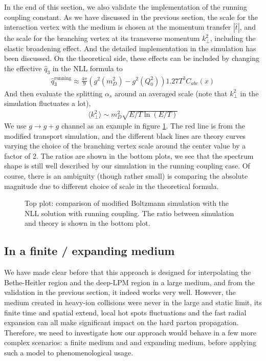 In the end of this section, we also validate the implementation of the running coupling constant.
As we have discussed in the previous section, the scale for the interaction vertex with the medium is chosen at the momentum transfer $|\hat{t}|$, and the scale for the branching vertex at its transverse momentum $k_\perp^2$, including the elastic broadening effect.
And the detailed implementation in the simulation has been discussed.
On the theoretical side, these effects can be included by changing the effective $\hat{q}_3$ in the NLL formula to 
\begin{eqnarray}
\hat{q}_3^{\textrm{running}} \approx \frac{4\pi}{9}\left(g^2(m_D^2) - g^2(Q_0^2)\right) 1.27 T^3 C_{abc}(x)
\label{eq:q3running}
\end{eqnarray}
And then evaluate the splitting $\alpha_s$ around an averaged scale (note that $k_\perp^2$ in the simulation fluctuates a lot),
\begin{eqnarray}
\langle k_\perp^2\rangle \sim m_D^2 \sqrt{E/T\ln(E/T)}
\end{eqnarray}  
We use $g\rightarrow g+g$ channel as an example in figure \ref{fig:running}.
The red line is from the modified transport simulation, and the different black lines are theory curves varying the choice of the branching vertex scale around the center value by a factor of 2.
The ratios are shown in the bottom plots, we see that the spectrum shape is still well described by our simulation in the running coupling case. 
Of course, there is an ambiguity (though rather small) is comparing the absolute magnitude due to different choice of scale in the theoretical formula.

\begin{figure}
\caption{Top plot: comparison of modified Boltzmann simulation with the NLL solution  with running coupling.
The ratio between simulation and theory is shown in the bottom plot.}
\label{fig:running}
\end{figure}


\subsection{In a finite / expanding medium}
We have made clear before that this approach is designed for interpolating the Bethe-Heitler region and the deep-LPM region in a large medium, and from the validation in the previous section, it indeed works very well.
However, the medium created in heavy-ion collisions were never in the large and static limit, its finite time and spatial extend, local hot spots fluctuations and the fast radial expansion can all make significant impact on the hard parton propagation. 
Therefore, we need to investigate how our approach would behave in a few more complex scenarios: a finite medium and and expanding medium, before applying such a model to phenomenological usage.

